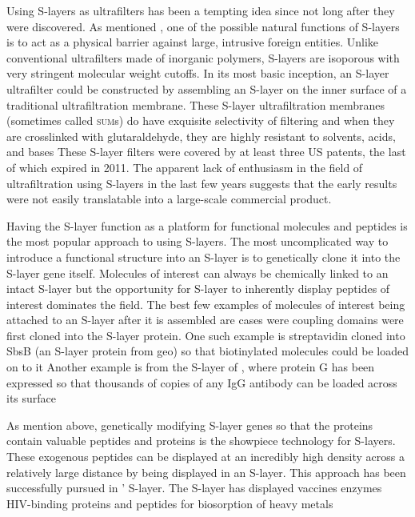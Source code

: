   Using \acp{S-layer} as ultrafilters has been a tempting idea since not long after they were discovered. As mentioned , one of the possible natural
functions of \acp{S-layer} is to act as a physical barrier against large, intrusive foreign entities. Unlike conventional ultrafilters made of inorganic polymers, \acp{S-layer} are
isoporous with very stringent molecular weight cutoffs. In its most basic inception, an \ac{S-layer} ultrafilter could be constructed by assembling an \ac{S-layer} on the inner
surface of a traditional ultrafiltration membrane. These \ac{S-layer} ultrafiltration membranes (sometimes called \textsc{sum}s) do have exquisite selectivity of filtering and when
they are crosslinked with glutaraldehyde, they are highly resistant to solvents, acids, and bases These \ac{S-layer} filters were covered by at least
three US patents, the last of which expired in 2011. The apparent lack of enthusiasm in the field of ultrafiltration using \acp{S-layer} in the last few years suggests that the
early results were not easily translatable into a large-scale commercial product.
  
 Having the \ac{S-layer} function as a platform for functional molecules and peptides is the most popular approach to using \acp{S-layer}. The most uncomplicated way to introduce
a functional structure into an \ac{S-layer} is to genetically clone it into the \ac{S-layer} gene itself. Molecules of interest can always be chemically linked to an intact
\ac{S-layer} but the opportunity for \ac{S-layer} to inherently display peptides of interest dominates the field. The best few examples of molecules
of interest being attached to an \ac{S-layer} after it is assembled are cases were coupling domains were first cloned into the \ac{S-layer} protein. One such example is
streptavidin cloned into SbsB (an \ac{S-layer} protein from \ac{geo}) so that biotinylated molecules could be loaded on to it Another example is from the
\ac{S-layer} of \caulobacter{}, where protein G has been expressed so that thousands of copies of any IgG antibody can be loaded across its surface

  As mention above, genetically modifying \ac{S-layer} genes so that the proteins contain valuable peptides and proteins is the showpiece technology for \acp{S-layer}. These
exogenous peptides can be displayed at an incredibly high density across a relatively large distance by being displayed in an \ac{S-layer}. This approach has been successfully
pursued in \caulobacter{}' \ac{S-layer}. The \caulobacter{} \ac{S-layer} has displayed vaccines enzymes HIV-binding
proteins and peptides for biosorption of heavy metals

